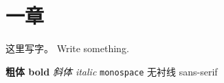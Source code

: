 \section{一章}

这里写字。 Write something.

\textbf{粗体 bold}
\textit{斜体 italic}
\texttt{monospace}
\textsf{无衬线 sans-serif}
